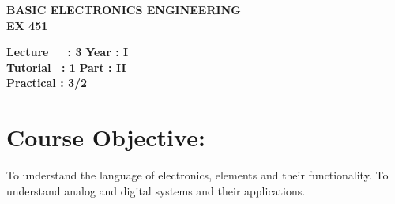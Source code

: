 \begin{center}
    \textbf{\huge{\uppercase{Basic Electronics Engineering}}}
    \\
    \vspace{.5cm}
    \textbf{\large{EX 451}}
\end{center}

\noindent\textbf{Lecture\ \ \ : 3} \hfill \textbf{Year : I } \\
\textbf{Tutorial \ : 1} \hfill \textbf{Part : II } \\
\textbf{Practical : 3/2}  \\

\par
\noindent 
\section*{Course Objective:}
To understand the language of electronics, elements and their functionality. To understand analog and digital systems and their applications.

